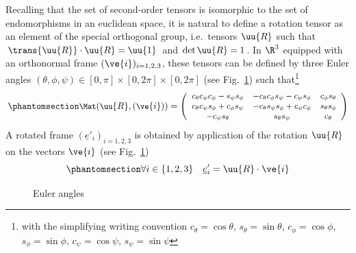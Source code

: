 \documentclass[
  letterpaper,
  DIV=11,
  numbers=noendperiod]{scrreprt}
\begin{document}
Recalling that the set of second-order tensors is isomorphic to the set
of endomorphisms in an euclidean space, it is natural to define a
rotation tensor as an element of the special orthogonal group,
i.e.~tensors \(\uu{R}\) such that \(\trans{\uu{R}}\cdot\uu{R}=\uu{1}\)
and \(\det{\uu{R}}=1\). In \(\R^3\) equipped with an orthonormal frame
\((\ve{i})_{i=1,2,3}\), these tensors can be defined by three Euler
angles \((θ,ϕ,ψ)∈[0,π]×[0,2π]×[0,2π]\) (see Fig.~\ref{fig-eulerangles})
such that\footnote{with the simplifying writing convention
  \(c_\theta=\cos\theta\), \(s_\theta=\sin\theta\), \(c_\phi=\cos\phi\),
  \(s_\phi=\sin\phi\), \(c_\psi=\cos\psi\), \(s_\psi=\sin\psi\)}
\begin{equation}\phantomsection\label{eq-rot3}{
\small
\Mat(\uu{R},(\ve{i}))=
   \left(
   \begin{array}{ccc}
   c_\theta  c_\psi  c_\phi - s_\psi  s_\phi & - c_\theta  c_\phi  s_\psi - c_\psi  s_\phi & c_\phi  s_\theta \\
   c_\theta  c_\psi  s_\phi + c_\phi  s_\psi & - c_\theta  s_\psi  s_\phi + c_\psi  c_\phi & s_\theta  s_\phi \\
   - c_\psi  s_\theta & s_\theta  s_\psi & c_\theta \\
   \end{array}
   \right) 
}\end{equation} A rotated frame \((\underline{e}'_i)_{i=1,2,3}\) is
obtained by application of the rotation \(\uu{R}\) on the vectors
\(\ve{i}\) (see Fig.~\ref{fig-eulerangles})
\begin{equation}\phantomsection\label{eq-Rei}{
\forall i \in \{1,2,3\}\quad \underline{e}'_i=\uu{R}\cdot\ve{i}
}\end{equation}

\begin{figure}


\caption{\label{fig-eulerangles}Euler angles}

\end{figure}%
\end{document}
